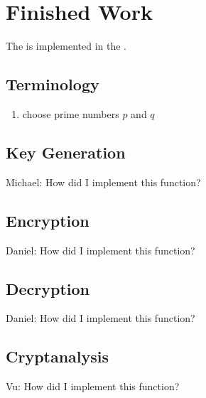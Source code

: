 \section{Finished Work}

The \cs{} \rsa{} is implemented in the \cf{} \cry.


\subsection{Terminology}

\begin{enumerate}
\item choose prime numbers $p$ and $q$
\end{enumerate}


\subsection{Key Generation}

Michael:
How did I implement this function?


\subsection{Encryption}

Daniel:
How did I implement this function?


\subsection{Decryption}

Daniel:
How did I implement this function?


\subsection{Cryptanalysis}

Vu:
How did I implement this function?
